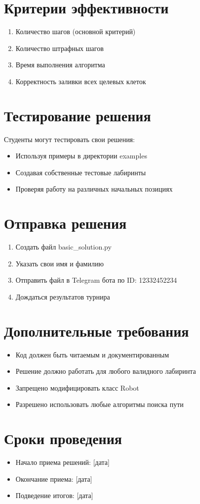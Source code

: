 \documentclass{article}
\begin{document}
\section{Критерии эффективности}
\begin{enumerate}
    \item Количество шагов (основной критерий)
    \item Количество штрафных шагов
    \item Время выполнения алгоритма
    \item Корректность заливки всех целевых клеток
\end{enumerate}

\section{Тестирование решения}
Студенты могут тестировать свои решения:
\begin{itemize}
    \item Используя примеры в директории examples
    \item Создавая собственные тестовые лабиринты
    \item Проверяя работу на различных начальных позициях
\end{itemize}

\section{Отправка решения}
\begin{enumerate}
    \item Создать файл basic\_solution.py
    \item Указать свои имя и фамилию
    \item Отправить файл в Telegram бота по ID: 12332452234
    \item Дождаться результатов турнира
\end{enumerate}

\section{Дополнительные требования}
\begin{itemize}
    \item Код должен быть читаемым и документированным
    \item Решение должно работать для любого валидного лабиринта
    \item Запрещено модифицировать класс Robot
    \item Разрешено использовать любые алгоритмы поиска пути
\end{itemize}

\section{Сроки проведения}
\begin{itemize}
    \item Начало приема решений: [дата]
    \item Окончание приема: [дата]
    \item Подведение итогов: [дата]
\end{itemize}
\end{document}
